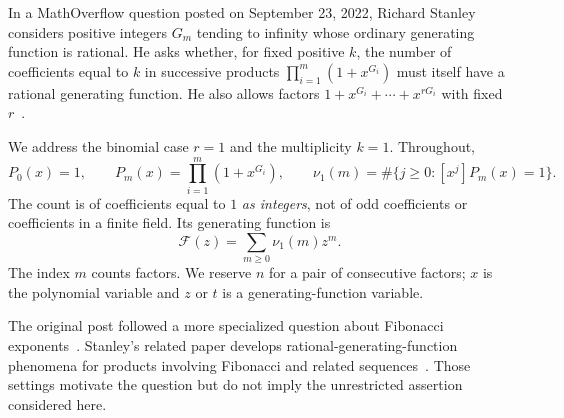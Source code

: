 \documentclass[11pt]{article}
\theoremstyle{definition}\newtheorem{definition}[theorem]{Definition}
\theoremstyle{remark}\newtheorem{remark}[theorem]{Remark}
\newcommand{\nuone}{\nu_1}
\newcommand{\F}{\mathcal F}
\begin{document}
In a MathOverflow question posted on September 23, 2022, Richard Stanley considers positive integers $G_m$ tending to infinity whose ordinary generating function is rational. He asks whether, for fixed positive $k$, the number of coefficients equal to $k$ in successive products $\prod_{i=1}^m(1+x^{G_i})$ must itself have a rational generating function. He also allows factors $1+x^{G_i}+\cdots+x^{rG_i}$ with fixed $r$~\cite{StanleyQuestion}.

We address the binomial case $r=1$ and the multiplicity $k=1$. Throughout,
\begin{equation}\label{eq:definitionP}
 P_0(x)=1,\qquad P_m(x)=\prod_{i=1}^m(1+x^{G_i}),\qquad
 \nuone(m)=\#\{j\geq0:[x^j]P_m(x)=1\}.
\end{equation}
The count is of coefficients equal to $1$ \emph{as integers}, not of odd coefficients or coefficients in a finite field. Its generating function is
\begin{equation}\label{eq:Fdef}
 \F(z)=\sum_{m\geq0}\nuone(m)z^m.
\end{equation}
The index $m$ counts factors. We reserve $n$ for a pair of consecutive factors; $x$ is the polynomial variable and $z$ or $t$ is a generating-function variable.

The original post followed a more specialized question about Fibonacci exponents~\cite{StanleyFibonacci}. Stanley's related paper develops rational-generating-function phenomena for products involving Fibonacci and related sequences~\cite{StanleyPaper}. Those settings motivate the question but do not imply the unrestricted assertion considered here.
\end{document}
